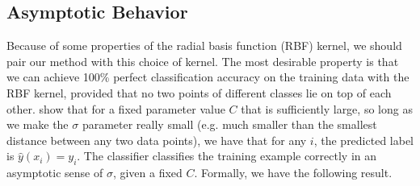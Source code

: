 \documentclass[12pt]{article}
\DeclareMathOperator{\sgn}{sgn}
\theoremstyle{definition}
\begin{document}




\subsection{Asymptotic Behavior}
Because of some properties of the radial basis function (RBF) kernel, we should pair our method with this choice of kernel. The most desirable property is that we can achieve 100\% perfect classification accuracy on the training data with the RBF kernel, provided that no two points of different classes lie on top of each other. \cite{KL-2003} show that for a fixed parameter value $C$ that is sufficiently large, so long as we make the $\sigma$ parameter really small (e.g. much smaller than the smallest distance between any two data points), we have that for any $i$, the predicted label is $\hat{y}(x_i)=y_i$. The classifier classifies the training example correctly in an asymptotic sense of $\sigma$,  given a fixed $C$. Formally, we have the following result. 
\end{document}
